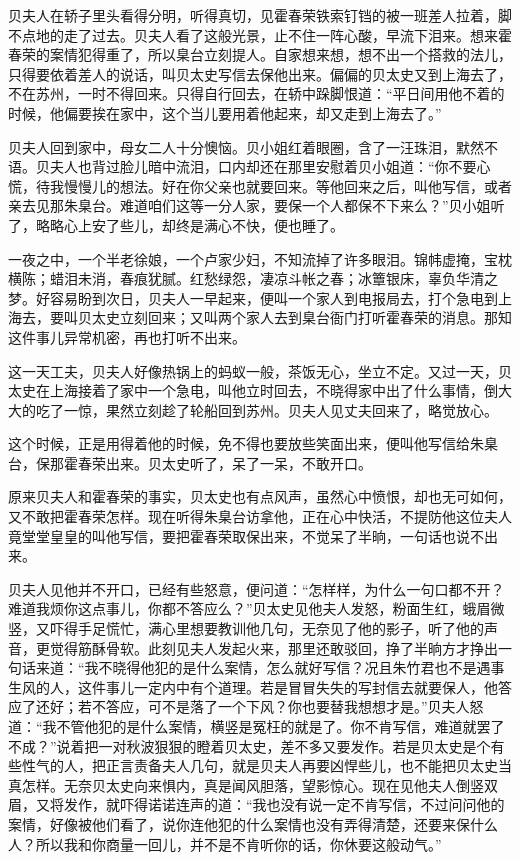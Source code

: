\documentclass[12pt,UTF8]{ctexbook}
\begin{document}
{{{贝夫人在轿子里头看得分明，听得真切，见霍春荣铁索钉铛的被一班差人拉着，脚不点地的走了过去。贝夫人看了这般光景，止不住一阵心酸，早流下泪来。想来霍春荣的案情犯得重了，所以臬台立刻提人。自家想来想，想不出一个搭救的法儿，只得要依着差人的说话，叫贝太史写信去保他出来。偏偏的贝太史又到上海去了，不在苏州，一时不得回来。只得自行回去，在轿中跺脚恨道：“平日间用他不着的时候，他偏要挨在家中，这个当儿要用着他起来，却又走到上海去了。”

贝夫人回到家中，母女二人十分懊恼。贝小姐红着眼圈，含了一汪珠泪，默然不语。贝夫人也背过脸儿暗中流泪，口内却还在那里安慰着贝小姐道：“你不要心慌，待我慢慢儿的想法。好在你父亲也就要回来。等他回来之后，叫他写信，或者亲去见那朱臬台。难道咱们这等一分人家，要保一个人都保不下来么？”贝小姐听了，略略心上安了些儿，却终是满心不快，便也睡了。

一夜之中，一个半老徐娘，一个卢家少妇，不知流掉了许多眼泪。锦帏虚掩，宝枕横陈；蜡泪未消，春痕犹腻。红愁绿怨，凄凉斗帐之春；冰簟银床，辜负华清之梦。好容易盼到次日，贝夫人一早起来，便叫一个家人到电报局去，打个急电到上海去，要叫贝太史立刻回来；又叫两个家人去到臬台衙门打听霍春荣的消息。那知这件事儿异常机密，再也打听不出来。

这一天工夫，贝夫人好像热锅上的蚂蚁一般，茶饭无心，坐立不定。又过一天，贝太史在上海接着了家中一个急电，叫他立时回去，不晓得家中出了什么事情，倒大大的吃了一惊，果然立刻趁了轮船回到苏州。贝夫人见丈夫回来了，略觉放心。

这个时候，正是用得着他的时候，免不得也要放些笑面出来，便叫他写信给朱臬台，保那霍春荣出来。贝太史听了，呆了一呆，不敢开口。

原来贝夫人和霍春荣的事实，贝太史也有点风声，虽然心中愤恨，却也无可如何，又不敢把霍春荣怎样。现在听得朱臬台访拿他，正在心中快活，不提防他这位夫人竟堂堂皇皇的叫他写信，要把霍春荣取保出来，不觉呆了半晌，一句话也说不出来。

贝夫人见他并不开口，已经有些怒意，便问道：“怎样样，为什么一句口都不开？难道我烦你这点事儿，你都不答应么？”贝太史见他夫人发怒，粉面生红，蛾眉微竖，又吓得手足慌忙，满心里想要教训他几句，无奈见了他的影子，听了他的声音，更觉得筋酥骨软。此刻见夫人发起火来，那里还敢驳回，挣了半晌方才挣出一句话来道：“我不晓得他犯的是什么案情，怎么就好写信？况且朱竹君也不是遇事生风的人，这件事儿一定内中有个道理。若是冒冒失失的写封信去就要保人，他答应了还好；若不答应，可不是落了一个下风？你也要替我想想才是。”贝夫人怒道：“我不管他犯的是什么案情，横竖是冤枉的就是了。你不肯写信，难道就罢了不成？”说着把一对秋波狠狠的瞪着贝太史，差不多又要发作。若是贝太史是个有些性气的人，把正言责备夫人几句，就是贝夫人再要凶悍些儿，也不能把贝太史当真怎样。无奈贝太史向来惧内，真是闻风胆落，望影惊心。现在见他夫人倒竖双眉，又将发作，就吓得诺诺连声的道：“我也没有说一定不肯写信，不过问问他的案情，好像被他们看了，说你连他犯的什么案情也没有弄得清楚，还要来保什么人？所以我和你商量一回儿，并不是不肯听你的话，你休要这般动气。”

}}}
\end{document}
